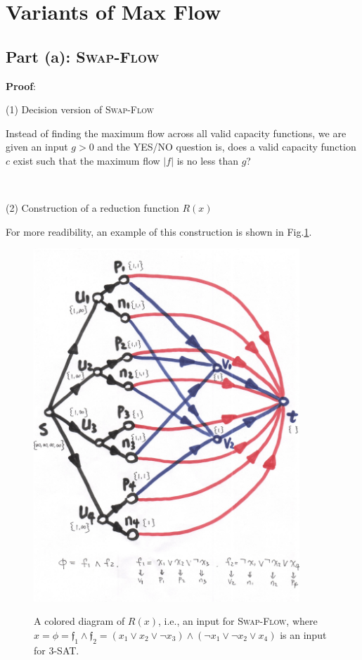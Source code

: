 \documentclass{article}
\begin{document}
\section{Variants of Max Flow}
\subsection{Part (a): \textsc{Swap-Flow}}
\noindent\textbf{Proof}:

\noindent(1) Decision version of \textsc{Swap-Flow}

Instead of finding the maximum flow across all valid capacity functions, we are given an input $g>0$ and the YES/NO question is, does a valid capacity function $c$ exist such that the maximum flow $|f|$ is no less than $g$?

~

\noindent(2) Construction of a reduction function $R(x)$

For more readibility, an example of this construction is shown in Fig.\ref{example}.
\begin{figure}[!htbp]
	\centering
	\includegraphics[width=10cm]{figure.jpg}\\
	\caption{A colored diagram of $R(x)$, i.e., an input for \textsc{Swap-Flow}, where $x=\phi=\mathfrak{f}_1\wedge\mathfrak{f}_2=(x_1\vee x_2\vee\neg x_3)\wedge(\neg x_1\vee\neg x_2\vee x_4)$ is an input for \textsc{3-SAT}.}
	\label{example}
\end{figure}
\end{document}
